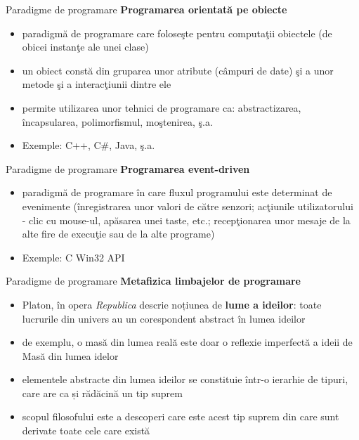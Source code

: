 \documentclass[pdf]{beamer}
\begin{document}
\begin{frame}{Paradigme de programare}
\textbf{Programarea orientată pe obiecte}
\begin{itemize}
\item
paradigmă de programare care foloseşte pentru computaţii obiectele (de obicei instanţe ale unei clase)
\item
un obiect constă din gruparea unor atribute (câmpuri de date) şi a unor metode şi a interacţiunii dintre ele
\item
permite utilizarea unor tehnici de programare ca: abstractizarea, încapsularea, polimorfismul, moştenirea, ş.a.
\item
Exemple: C++, C\#, Java, ş.a.
\end{itemize}
\end{frame}



\begin{frame}{Paradigme de programare}
\textbf{Programarea event-driven}
\begin{itemize}
\item
paradigmă de programare în care fluxul programului este determinat de evenimente (înregistrarea unor valori de către senzori; acţiunile utilizatorului - clic cu mouse-ul, apăsarea unei taste, etc.; recepţionarea unor mesaje de la alte fire de execuţie sau de la alte programe)
\item
Exemple: C Win32 API
\end{itemize}
\end{frame}



\begin{frame}{Paradigme de programare}
\textbf{Metafizica limbajelor de programare}
\begin{itemize}
\item
Platon, în opera \textit{Republica} descrie noțiunea de \textbf{lume a ideilor}: toate lucrurile din univers au un corespondent abstract în lumea ideilor
\item
de exemplu, o masă din lumea reală este doar o reflexie imperfectă a ideii de Masă din lumea idelor
\item
elementele abstracte din lumea ideilor se constituie într-o ierarhie de tipuri, care are ca și rădăcină un tip suprem
\item
scopul filosofului este a descoperi care este acest tip suprem din care sunt derivate toate cele care există
\end{itemize}
\end{frame}
\end{document}

